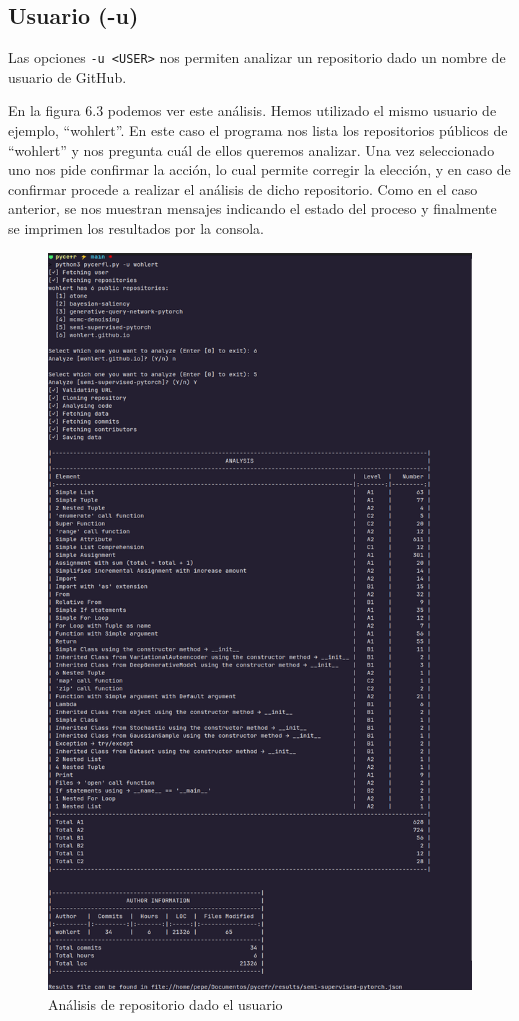 \documentclass[a4paper, 12pt]{book}
\begin{document}
\subsection{Usuario (-u)}

Las opciones \texttt{-u <USER>} nos permiten analizar un repositorio dado un nombre de usuario de GitHub. 

En la figura 6.3 podemos ver este análisis. Hemos utilizado el mismo usuario de ejemplo, ``wohlert''. En este caso el programa nos lista los repositorios públicos de ``wohlert'' y nos pregunta cuál de ellos queremos analizar. Una vez seleccionado uno nos pide confirmar la acción, lo cual permite corregir la elección, y en caso de confirmar procede a realizar el análisis de dicho repositorio. Como en el caso anterior, se nos muestran mensajes indicando el estado del proceso y finalmente se imprimen los resultados por la consola.
\newpage
\begin{figure}[H]
    \centering
    \includegraphics[height=\textheight, keepaspectratio]{img/results/backend_exe_u.png}
    \caption{Análisis de repositorio dado el usuario}
    \label{fig:analysis_user}
\end{figure}
\end{document}
